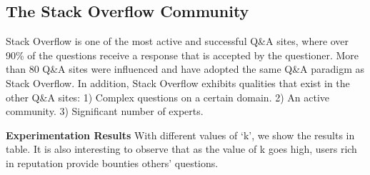 \subsection{The Stack Overflow Community}
	Stack Overflow is one of the most active and successful Q\&A sites, where over 90\% of the questions receive a response that is accepted by the questioner. More than 80 Q\&A sites were influenced and have adopted the same Q\&A paradigm as Stack Overflow. In addition, Stack Overflow exhibits qualities that exist in the other Q\&A sites: 1) Complex questions on a certain domain. 2) An active community. 3) Significant number of experts.

\textbf{Experimentation Results} 
With different values of ‘k’, we show the results in table. It is also interesting to observe that as the value of k goes high, users rich in reputation provide bounties others’ questions.







